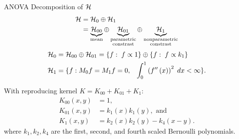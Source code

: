 \begin{frame}{ANOVA Decomposition of $\mathcal{H}$}{}
\footnotesize
\begin{align*}%
\hilbert &= \hilbert_0 \oplus \hilbert_1\\
&= \underbrace{\hilbert_{00}}_{\text{mean}}  \oplus  \underbrace{\hilbert_{01}}_{\substack{\text{parametric} \\ \text{constrast}}} \oplus \underbrace{\hilbert_1}_{\substack{\text{nonparametric} \\ \text{constrast}}}
\end{align*}
\begin{align*}
\hilbert_0 &=  \hilbert_{00} \oplus \hilbert_{01} = \left\{f: \;f \propto 1 \right\} \oplus \left\{f: \;f \propto k_1\right\} \\
\hilbert_{1} &= \lbrace f: M_0 f = M_1 f =  0,\;\;\;\int_{0}^1 \left(f''\left(x\right)\right)^2\;dx < \infty \rbrace. %
\end{align*}

With reproducing kernel $K = K_{00} + K_{01} + K_1$: 
\begin{align*}
K_{00}\left(x,y\right) &= 1,\\
K_{01}\left(x,y\right) &= k_1\left(x\right)k_1\left(y\right), \mbox{ and}\\
K_{1}\left(x,y\right) &= k_2\left(x\right)k_2\left(y\right) - k_4\left(x-y\right).
\end{align*}
where $k_1, k_2, k_4$ are the first, second, and fourth scaled Bernoulli polynomials.
\end{frame}


%

